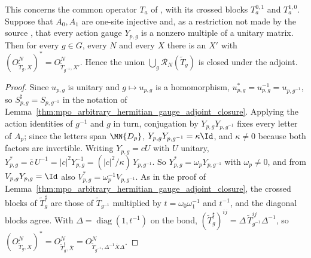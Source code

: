 \begin{lemma}
    \label{thm:mpo_arbitrary_unitary_gauge_union_closure}
    \leanok
    This concerns the common operator $T_a$ of
    \cite[Section~5]{GarreRubio2023MPOSym}, with its crossed blocks
    $T^{0,1}_a$ and $T^{1,0}_a$. Suppose that $A_0,A_1$ are one-site
    injective and, as a restriction not made by the source
    \cite{gap:glm23_mixed_path_parent_commutation}, that every action
    gauge $Y_{p,g}$ is a nonzero multiple of a unitary matrix. Then for
    every $g\in G$, every $N$ and every $X$ there is an $X'$ with
    $(O^N_{\widetilde T_g,X})^*=O^N_{\widetilde T_{g^{-1}},X'}$. Hence the
    union $\bigcup_g\mathcal R_N(\widetilde T_g)$ is closed under the
    adjoint.
\end{lemma}
\begin{proof}
    \leanok
    Since $u_{p,g}$ is unitary and $g\mapsto u_{p,g}$ is a homomorphism,
    $u_{p,g}^*=u_{p,g}^{-1}=u_{p,g^{-1}}$, so $S_{p,g}^\sharp=S_{p,g^{-1}}$
    in the notation of
    Lemma~\ref{thm:mpo_arbitrary_hermitian_gauge_adjoint_closure}. Applying
    the action identities of $g^{-1}$ and $g$ in turn, conjugation by
    $Y_{p,g}Y_{p,g^{-1}}$ fixes every letter of $A_p$; since the letters
    span $\MN{D_p}$, $Y_{p,g}Y_{p,g^{-1}}=\kappa\Id$, and $\kappa\neq0$
    because both factors are invertible. Writing $Y_{p,g}=cU$ with $U$
    unitary, $Y_{p,g}^*=\bar c\,U^{-1}=|c|^2Y_{p,g}^{-1}=
        (|c|^2/\kappa)\,Y_{p,g^{-1}}$. So $Y_{p,g}^*=\omega_pY_{p,g^{-1}}$
    with $\omega_p\neq0$, and from $V_{p,g}Y_{p,g}=\Id$ also
    $V_{p,g}^*=\omega_p^{-1}V_{p,g^{-1}}$. As in the proof of
    Lemma~\ref{thm:mpo_arbitrary_hermitian_gauge_adjoint_closure}, the
    crossed blocks of $\widetilde T_g^\sharp$ are those of
    $\widetilde T_{g^{-1}}$ multiplied by $t=\omega_0\omega_1^{-1}$ and
    $t^{-1}$, and the diagonal blocks agree. With
    $\Delta=\operatorname{diag}(1,t^{-1})$ on the bond,
    $(\widetilde T_g^\sharp)^{ij}=\Delta\,\widetilde T_{g^{-1}}^{ij}\Delta^{-1}$,
    so $(O^N_{\widetilde T_g,X})^*=O^N_{\widetilde T_g^\sharp,\bar X}=
        O^N_{\widetilde T_{g^{-1}},\Delta^{-1}\bar X\Delta}$.
\end{proof}

